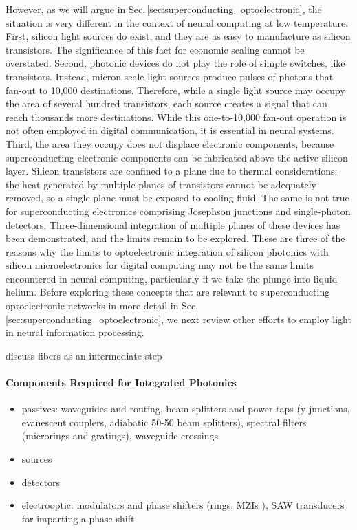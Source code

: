 However, as we will argue in Sec.\,\ref{sec:superconducting_optoelectronic}, the situation is very different in the context of neural computing at low temperature. First, silicon light sources do exist, and they are as easy to manufacture as silicon transistors. The significance of this fact for economic scaling cannot be overstated. Second, photonic devices do not play the role of simple switches, like transistors. Instead, micron-scale light sources produce pulses of photons that fan-out to 10,000 destinations. Therefore, while a single light source may occupy the area of several hundred transistors, each source creates a signal that can reach thousands more destinations. While this one-to-10,000 fan-out operation is not often employed in digital communication, it is essential in neural systems. Third, the area they occupy does not displace electronic components, because superconducting electronic components can be fabricated above the active silicon layer. Silicon transistors are confined to a plane due to thermal considerations: the heat generated by multiple planes of transistors cannot be adequately removed, so a single plane must be exposed to cooling fluid. The same is not true for superconducting electronics comprising Josephson junctions and single-photon detectors. Three-dimensional integration of multiple planes of these devices has been demonstrated, and the limits remain to be explored. These are three of the reasons why the limits to optoelectronic integration of silicon photonics with silicon microelectronics for digital computing may not be the same limits encountered in neural computing, particularly if we take the plunge into liquid helium. Before exploring these concepts that are relevant to superconducting optoelectronic networks in more detail in Sec.\,\ref{sec:superconducting_optoelectronic}, we next review other efforts to employ light in neural information processing.


\vspace{3em}
discuss fibers as an intermediate step
\paragraph{Components Required for Integrated Photonics}
\begin{itemize}
\item passives: waveguides and routing, beam splitters and power taps (y-junctions, evanescent couplers, adiabatic 50-50 beam splitters), spectral filters (microrings \cite{ra2007} and gratings), waveguide crossings
\item sources
\item detectors
\item electrooptic: modulators and phase shifters (rings, MZIs \cite{ohno1975}), SAW transducers for imparting a phase shift
\end{itemize}

